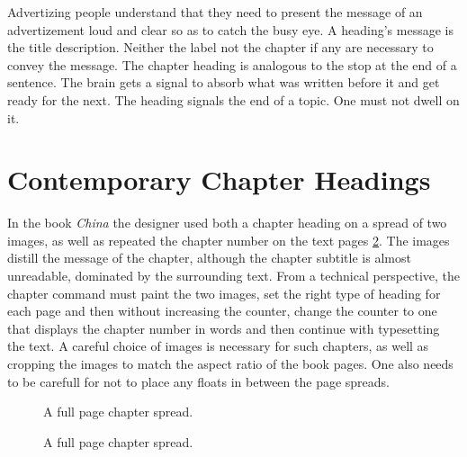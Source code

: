 Advertizing people understand that they need to present the message of an advertizement loud and clear so as to catch the busy eye. A heading's message is the title description. Neither the label not the chapter if any are necessary to convey the message. The chapter heading is analogous to the stop at the end of a sentence. The brain gets a signal to absorb what was written before it and get ready for the next. The heading signals the end of a topic. One must not dwell on it.


\section{Contemporary Chapter Headings}

In the book \textit{China} the designer used both a chapter heading on a spread of two images, as well as repeated the chapter number on the text pages \ref{fig:threepage}. The images distill the message of the chapter, although the chapter subtitle is almost unreadable, dominated by the surrounding text. From a technical perspective, the chapter command must paint the two images, set the right type of heading for each page and then without increasing the counter, change the counter to one that displays the chapter number in words and then continue with typesetting the text. A careful choice of images is necessary for such chapters, as well as cropping the images to match the aspect ratio of the book pages. One also needs to be carefull for \latexe not to place any floats in between the page spreads. 

\begin{figure}[htbp]
\parindent=0pt
\centering
{}\par
\vfill

\par
\caption{A full page chapter spread.}
\label{fig:threepage}
\end{figure}

\begin{figure}[htbp]
\parindent=0pt
\centering
{}\par
\vfill

\par
\caption{A full page chapter spread.}
\label{fig:threepage}
\end{figure}


